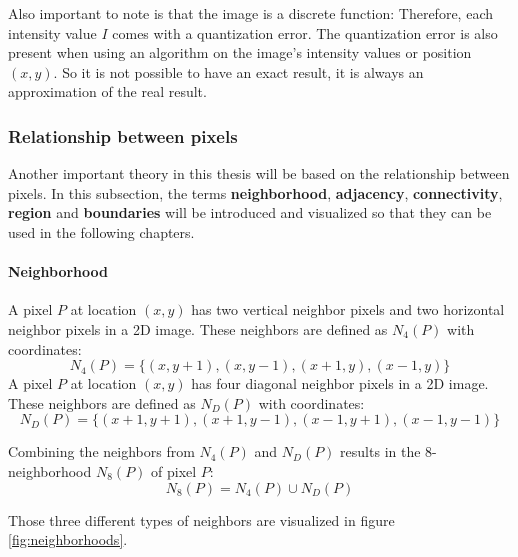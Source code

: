Also important to note is that the image is a discrete function: Therefore, each intensity value $I$ comes with a quantization error. The quantization error is also present when using an algorithm on the image's intensity values or position $(x,y)$. So it is not possible to have an exact result, it is always an approximation of the real result.

\subsubsection{Relationship between pixels}
Another important theory in this thesis will be based on the relationship between pixels. In this subsection, the terms \textbf{neighborhood}, \textbf{adjacency}, \textbf{connectivity}, \textbf{region} and \textbf{boundaries} will be introduced and visualized so that they can be used in the following chapters. 

\paragraph{Neighborhood}
A pixel $P$ at location $(x,y)$ has two vertical neighbor pixels and two horizontal neighbor pixels in a 2D image. These neighbors are defined as $N_4(P)$ with coordinates: 
\begin{equation}
        N_4(P) = \{(x,y+1),(x,y-1),(x+1,y),(x-1,y)\}
\end{equation}
A pixel $P$ at location $(x,y)$ has four diagonal neighbor pixels in a 2D image. These neighbors are defined as $N_D(P)$ with coordinates:
\begin{equation}
    N_D(P) = \{(x+1,y+1),(x+1,y-1),(x-1,y+1),(x-1,y-1)\}
\end{equation}

Combining the neighbors from $N_4(P)$ and $N_D(P)$ results in the 8-neighborhood $N_8(P)$ of pixel $P$:
\begin{equation}
    N_8(P) = N_4(P) \cup N_D(P)
\end{equation}

Those three different types of neighbors are visualized in figure \ref{fig:neighborhoods}.

